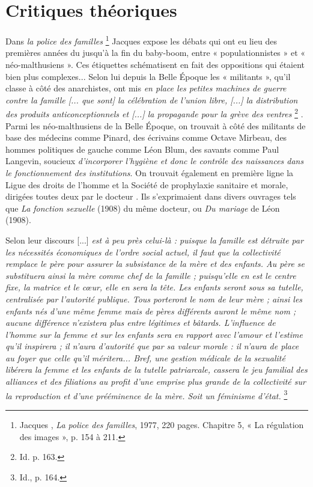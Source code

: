 

\section{Critiques théoriques}

 Dans \emph{la police des familles}%
\footnote{Jacques , \emph{La police des familles}, 1977, 220 pages. Chapitre 5, « La régulation des images », p. 154 à 211.} 
Jacques  expose les débats qui ont eu lieu des premières années du  jusqu'à la fin du baby-boom, entre « populationnistes » et « néo-malthusiens ». Ces étiquettes schématisent en fait des oppositions qui étaient bien plus complexes... Selon lui depuis la Belle Époque les « militants », qu'il classe à côté des anarchistes, ont mis {\emph{en place les petites machines de guerre contre la famille \emph{[... que sont]} la célébration de l'union libre, \emph{[...]} la distribution des produits anticonceptionnels et \emph{[...]} la propagande pour la grève des ventres}%
\footnote{Id. p. 163.}%
}. Parmi les néo-malthusiens de la Belle Époque, on trouvait à côté des militants de base des médecins comme Pinard, des écrivains comme \hbox{Octave} Mirbeau, des hommes politiques de gauche comme Léon Blum, des savants comme Paul Langevin, soucieux {\emph{d'incorporer l'hygiène et donc le contrôle des naissances dans le fonctionnement des institutions}}. On trouvait également en première ligne la Ligue des droits de l'homme et la Société de prophylaxie sanitaire et morale, dirigées toutes deux par le docteur \hbox{}. Ils s'exprimaient dans divers ouvrages tels que \emph{La fonction sexuelle} (1908) du même docteur, ou \emph{Du mariage} de Léon  (1908). 

 Selon  leur discours {[...] \emph{est à peu près celui-là : puisque la famille est détruite par les nécessités économiques de l'ordre social actuel, il faut que la collectivité remplace le père pour assurer la subsistance de la mère et des enfants. Au père se substituera ainsi la mère comme chef de la famille ; puisqu'elle en est le centre fixe, la matrice et le cœur, elle en sera la tête. Les enfants seront sous sa tutelle, centralisée par l'autorité publique. Tous porteront le nom de leur mère ; ainsi les enfants nés d'une même femme mais de pères différents auront le même nom ; aucune différence n'existera plus entre légitimes et bâtards. L'influence de l'homme sur la femme et sur les enfants sera en rapport avec l'amour et l'estime qu'il inspirera ; il n'aura d'autorité que par sa valeur morale : il n'aura de place au foyer que celle qu'il méritera... Bref, une gestion médicale de la sexualité libérera la femme et les enfants de la tutelle patriarcale, cassera le jeu familial des alliances et des filiations au profit d'une emprise plus grande de la collectivité sur la reproduction et d'une prééminence de la mère. Soit un féminisme d'état.}%
\footnote{Id., p. 164.}%
}

